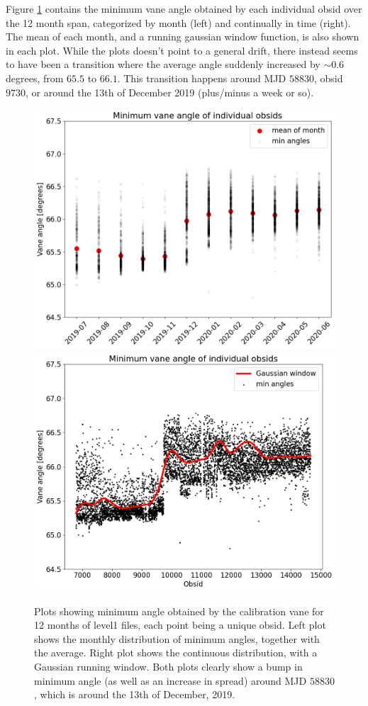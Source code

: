 \documentclass[10pt, a4paper]{article}
\begin{document}
Figure \ref{fig:angle_drift} contains the minimum vane angle obtained by each individual obsid over the 12 month span, categorized by month (left) and continually in time (right). The mean of each month, and a running gaussian window function, is also shown in each plot. While the plots doesn't point to a general drift, there instead seems to have been a transition where the average angle suddenly increased by $\sim 0.6$ degrees, from $65.5$ to $66.1$. This transition happens around MJD $58830$, obsid $9730$, or around the 13th of December 2019 (plus/minus a week or so).

\begin{figure}[H]
    \centering
    \includegraphics[scale=0.36]{../plots/angle_minima.png}
    \includegraphics[scale=0.36]{../plots/angle_minima_datetime.png}
    \caption{Plots showing minimum angle obtained by the calibration vane for 12 months of level1 files, each point being a unique obsid. Left plot shows the monthly distribution of minimum angles, together with the average. Right plot shows the continuous distribution, with a Gaussian running window. Both plots clearly show a bump in minimum angle (as well as an increase in spread) around MJD $58830$, which is around the 13th of December, 2019.}
    \label{fig:angle_drift}
\end{figure}
\end{document}
